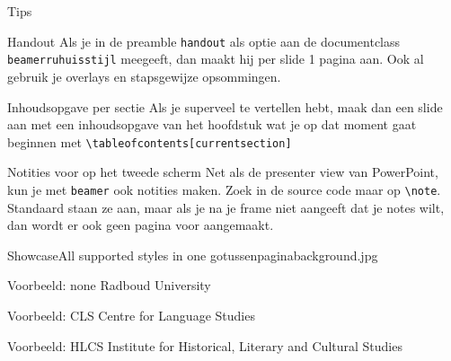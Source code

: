 \documentclass[department=ds, notes={show notes}, slidesperpage=4, handout, official=true]{beamerruhuisstijl}
\begin{document}
\begin{frame}{Tips}
    \begin{block}{Handout}
        Als je in de preamble \texttt{handout} als optie aan de documentclass \texttt{beamerruhuisstijl} meegeeft, dan maakt hij per slide 1 pagina aan. Ook al gebruik je overlays en stapsgewijze opsommingen.
    \end{block}

    \begin{block}{Inhoudsopgave per sectie}
        Als je superveel te vertellen hebt, maak dan een slide aan met een inhoudsopgave van het hoofdstuk wat je op dat moment gaat beginnen met \texttt{\textbackslash tableofcontents[currentsection]}
    \end{block}

    \begin{block}{Notities voor op het tweede scherm}
        Net als de presenter view van PowerPoint, kun je met \texttt{beamer} ook notities maken. Zoek in de source code maar op \texttt{\textbackslash note}. Standaard staan ze aan, maar als je na je frame niet aangeeft dat je notes wilt, dan wordt er ook geen pagina voor aangemaakt. 
    \end{block}
\end{frame}
\note{}


\begin{tussenpagina}{Showcase}{All supported styles in one go}{tussenpaginabackground.jpg}
\end{tussenpagina}
\note{}

\renewcommand{\dept}{none}
\begin{frame}
    \titlepage
\end{frame}
\begin{frame}{Voorbeeld: none}
	Radboud University
\end{frame}

\renewcommand{\dept}{cls}
\begin{frame}
    \titlepage
\end{frame}
\begin{frame}{Voorbeeld: CLS}
	Centre for Language Studies
\end{frame}

\renewcommand{\dept}{hlcs}
\begin{frame}
    \titlepage
\end{frame}
\begin{frame}{Voorbeeld: HLCS}
	Institute for Historical, Literary and Cultural Studies
\end{frame}
\end{document}
